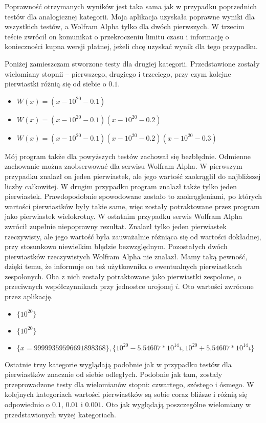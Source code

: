 Poprawność otrzymanych wyników jest taka sama jak w przypadku poprzednich testów dla analogicznej kategorii. Moja aplikacja uzyskała poprawne wyniki dla wszystkich testów, a Wolfram Alpha tylko dla dwóch pierwszych. W trzecim teście zwrócił on komunikat o przekroczeniu limitu czasu i informację o konieczności kupna wersji płatnej, jeżeli chcę uzyskać wynik dla tego przypadku.

Poniżej zamieszczam stworzone testy dla drugiej kategorii. Przedstawione zostały wielomiany stopnii -- pierwszego, drugiego i trzeciego, przy czym kolejne pierwiastki różnią się od siebie o $0.1$.
\begin{itemize}
	\item $W(x)=(x-10^{20}-0.1)$
	\item $W(x)=(x-10^{20}-0.1)(x-10^{20}-0.2)$
	\item $W(x)=(x-10^{20}-0.1)(x-10^{20}-0.2)(x-10^{20}-0.3)$
\end{itemize}

Mój program także dla powyższych testów zachował się bezbłędnie. Odmienne zachowanie można zaobserwować dla serwisu Wolfram Alpha. W pierwszym przypadku znalazł on jeden pierwiastek, ale jego wartość zaokrąglił do najbliższej liczby całkowitej. W drugim przypadku program znalazł także tylko jeden pierwiastek. Prawdopodobnie spowodowane zostało to zaokrągleniami, po których wartości pierwiastków były takie same, więc zostały potraktowane przez program jako pierwiastek wielokrotny. W ostatnim przypadku serwis Wolfram Alpha zwrócił zupełnie niepoprawny rezultat. Znalazł tylko jeden pierwiastek rzeczywisty, ale jego wartość była zauważalnie różniąca się od wartości dokładnej, przy stosunkowo niewielkim błędzie bezwzględnym. Pozostałych dwóch pierwiastków rzeczywistych Wolfram Alpha nie znalazł. Mamy taką pewność, dzięki temu, że informuje on też użytkownika o ewentualnych pierwiastkach zespolonych. Oba z nich zostały potraktowane jako pierwiastki zespolone, o przeciwnych współczynnikach przy jednostce urojonej $i$. Oto wartości zwrócone przez aplikację.
\begin{itemize}
	\item $\{10^{20}\}$
	\item $\{10^{20}\}$
	\item $\{x = 99999359596691898368\}, \{10^{20}-5.54607*10^{14}i, 10^{20}+5.54607*10^{14}i\}$
\end{itemize}

Ostatnie trzy kategorie wyglądają podobnie jak w przypadku testów dla pierwiastków znacznie od siebie odległych. Podobnie jak tam, zostały przeprowadzone testy dla wielomianów stopni: czwartego, szóstego i ósmego. W kolejnych kategoriach wartości pierwiastków są sobie coraz bliższe i różnią się odpowiednio o $0.1$, $0.01$ i $0.001$. Oto jak wyglądają poszczególne wielomiany w przedstawionych wyżej kategoriach.


